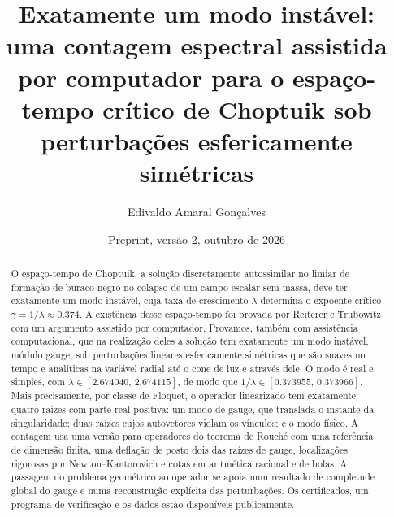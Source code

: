 \documentclass[11pt]{amsart}
\title[Um modo instável para o espaço-tempo de Choptuik]{Exatamente um modo instável: uma contagem espectral
assistida por computador para o espaço-tempo crítico de Choptuik sob perturbações esfericamente simétricas}
\author{Edivaldo Amaral Gon\c{c}alves}
\date{Preprint, versão 2, outubro de 2026}
\begin{document}
\begin{abstract}
O espaço-tempo de Choptuik, a solução discretamente autossimilar no limiar de formação de buraco negro no
colapso de um campo escalar sem massa, deve ter exatamente um modo instável, cuja taxa de crescimento $\lambda$
determina o expoente crítico $\gamma=1/\lambda\approx0.374$. A existência desse espaço-tempo foi provada por
Reiterer e Trubowitz com um argumento assistido por computador. Provamos, também com assistência computacional, que na
realização deles a solução tem exatamente um modo instável, módulo gauge, sob perturbações lineares esfericamente
simétricas que são suaves no tempo e analíticas na variável radial até o cone de luz e através dele. O
modo é real e simples, com $\lambda\in[2.674040,\,2.674115]$, de modo que
$1/\lambda\in[0.373955,\,0.373966]$. Mais precisamente, por classe de Floquet, o operador linearizado tem exatamente quatro
raízes com parte real positiva: um modo de gauge, que translada o instante da singularidade; duas raízes cujos
autovetores violam os vínculos; e o modo físico. A contagem usa uma versão para operadores do teorema de Rouch\'e
com uma referência de dimensão finita, uma deflação de posto dois das raízes de gauge, localizações rigorosas por
Newton--Kantorovich e cotas em aritmética racional e de bolas. A passagem do problema geométrico ao operador
se apoia num resultado de completude global do gauge e numa reconstrução explícita das perturbações. Os
certificados, um programa de verificação e os dados estão disponíveis publicamente.
\end{abstract}

\maketitle
\setcounter{tocdepth}{1}
\tableofcontents












\appendix
{}%






\end{document}
